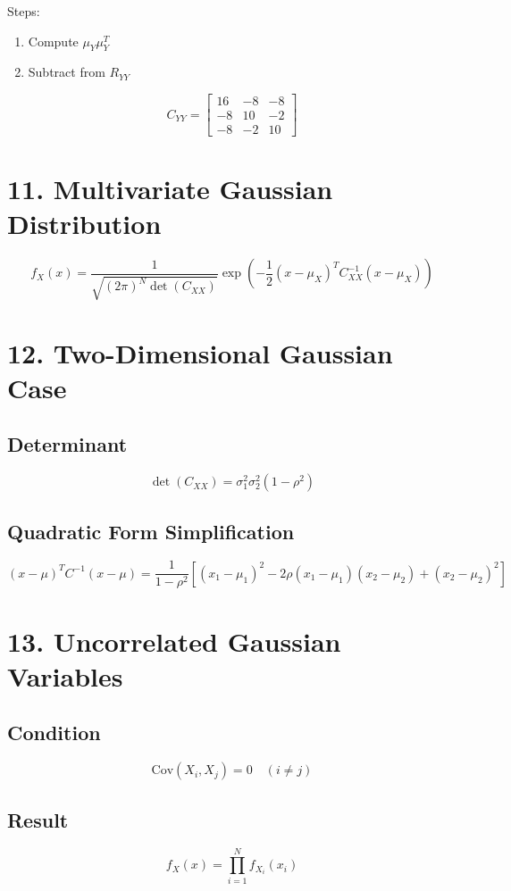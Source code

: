 \documentclass{article}
\begin{document}
Steps:
\begin{enumerate}
\item Compute $\mu_Y \mu_Y^T$
\item Subtract from $R_{YY}$
\end{enumerate}

\[
C_{YY} =
\begin{bmatrix}
16 & -8 & -8 \\
-8 & 10 & -2 \\
-8 & -2 & 10
\end{bmatrix}
\]

\section*{11. Multivariate Gaussian Distribution}

\[
f_X(x) =
\frac{1}{\sqrt{(2\pi)^N \det(C_{XX})}}
\exp\left(-\frac{1}{2}(x-\mu_X)^T C_{XX}^{-1}(x-\mu_X)\right)
\]

\section*{12. Two-Dimensional Gaussian Case}

\subsection*{Determinant}
\[
\det(C_{XX}) = \sigma_1^2 \sigma_2^2 (1 - \rho^2)
\]

\subsection*{Quadratic Form Simplification}

\[
(x - \mu)^T C^{-1} (x - \mu)
=
\frac{1}{1-\rho^2}
\left[(x_1-\mu_1)^2 - 2\rho(x_1-\mu_1)(x_2-\mu_2) + (x_2-\mu_2)^2\right]
\]

\section*{13. Uncorrelated Gaussian Variables}

\subsection*{Condition}
\[
\text{Cov}(X_i, X_j) = 0 \quad (i \ne j)
\]

\subsection*{Result}
\[
f_X(x) = \prod_{i=1}^{N} f_{X_i}(x_i)
\]
\end{document}
